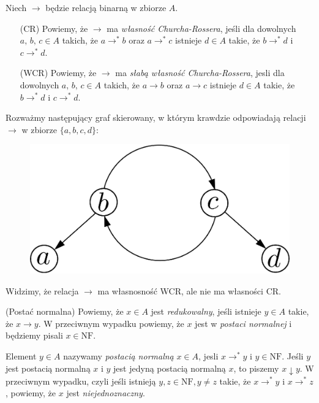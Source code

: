 \begin{definicja}
  Niech \(\to\) będzie relacją binarną w zbiorze \(A\). 
\begin{enumerate}
  \setlength\itemsep{0em}
  \item[(CR) ] Powiemy, że \(\to\) ma \emph{własność Churcha-Rossera}, jeśli
               dla dowolnych \(a,\,b,\,c\in A\) takich, że
               \(a\to^{*}b\) oraz \(a\to^{*} c\) istnieje \(d\in A\)
               takie, że \(b\to^{*} d\) i \(c\to^{*} d\).

  \item[(WCR)] Powiemy, że \(\to\) ma \emph{słabą własność 
               Churcha-Rossera}, jesli dla dowolnych \(a,\,b,\,c\in A\)
               takich, że \(a\to b\) oraz \(a\to c\) istnieje \(d\in A\) 
               takie, że \(b\to^{*} d\) i \(c\to^{*} d\).
\end{enumerate}
\end{definicja}
\begin{uwaga*}
  Rozważmy następujący graf skierowany, w którym krawdzie odpowiadają relacji \(\to\) w zbiorze \(\{a,b,c,d\}\):
  \begin{figure}[h]
    \centering
    \includegraphics[width=0.32\linewidth]{../wcrnotcr_example}
  \end{figure}

  Widzimy, że relacja \(\to\) ma własnosność WCR, ale nie ma własności CR.
\end{uwaga*}
\begin{definicja}(Postać normalna)
  Powiemy, że \(x\in A\) jest \emph{redukowalny}, jeśli istnieje \(y\in A\) takie, że \(x\to y\). W przeciwnym wypadku powiemy, że \(x\) jest w \emph{postaci normalnej} i będziemy pisali \(x\in\mathrm{NF}\). 
  
  Element \(y\in A\) nazywamy \emph{postacią normalną} \(x\in A\), jesli \(x\to^{*}y\) i \(y\in\mathrm{NF}\). Jeśli \(y\) jest postacią normalną \(x\) i \(y\) jest jedyną postacią normalną \(x\), to piszemy \(x\downarrow y\). W przeciwnym wypadku, czyli jeśli istnieją \(y, z\in \mathrm{NF}, y\neq z\) takie, że \(x\to^{*} y\) i \(x\to^{*} z\), powiemy, że \(x\) jest \emph{niejednoznaczny}. 
\end{definicja}

